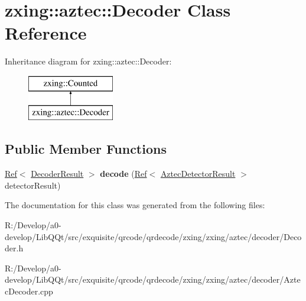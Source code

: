\hypertarget{classzxing_1_1aztec_1_1_decoder}{}\section{zxing\+:\+:aztec\+:\+:Decoder Class Reference}
\label{classzxing_1_1aztec_1_1_decoder}
Inheritance diagram for zxing\+:\+:aztec\+:\+:Decoder\+:\begin{figure}[H]
\begin{center}
\leavevmode
\includegraphics[height=2.000000cm]{classzxing_1_1aztec_1_1_decoder}
\end{center}
\end{figure}
\subsection*{Public Member Functions}
\begin{DoxyCompactItemize}
\item 
\mbox{\label{classzxing_1_1aztec_1_1_decoder_ae5a7d844e9b279e29f858ce56d050c6b}} 
\mbox{\hyperlink{classzxing_1_1_ref}{Ref}}$<$ \mbox{\hyperlink{classzxing_1_1_decoder_result}{Decoder\+Result}} $>$ {\bfseries decode} (\mbox{\hyperlink{classzxing_1_1_ref}{Ref}}$<$ \mbox{\hyperlink{classzxing_1_1aztec_1_1_aztec_detector_result}{Aztec\+Detector\+Result}} $>$ detector\+Result)
\end{DoxyCompactItemize}


The documentation for this class was generated from the following files\+:\begin{DoxyCompactItemize}
\item 
R\+:/\+Develop/a0-\/develop/\+Lib\+Q\+Qt/src/exquisite/qrcode/qrdecode/zxing/zxing/aztec/decoder/Decoder.\+h\item 
R\+:/\+Develop/a0-\/develop/\+Lib\+Q\+Qt/src/exquisite/qrcode/qrdecode/zxing/zxing/aztec/decoder/Aztec\+Decoder.\+cpp\end{DoxyCompactItemize}
